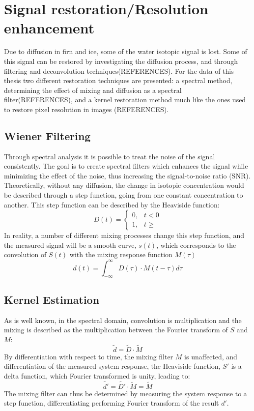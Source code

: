 \documentclass[11pt]{article}
\begin{document}
\section{Signal restoration/Resolution enhancement}
Due to diffusion in firn and ice, some of the water isotopic signal is lost. Some of this signal can be restored by investigating the diffusion process, and through filtering and deconvolution techniques(REFERENCES).
For the data of this thesis two different restoration techniques are presented: a spectral method, determining the effect of mixing and diffusion as a spectral filter(REFERENCES), and a kernel restoration method much like the ones used to restore pixel resolution in images (REFERENCES). 
\subsection{Wiener Filtering}
Through spectral analysis it is possible to treat the noise of the signal consistently. The goal is to create spectral filters which enhances the signal while minimizing the effect of the noise, thus increasing the signal-to-noise ratio (SNR).\\
Theoretically, without any diffusion, the change in isotopic concentration would be described through a step function, going from one constant concentration to another. This step function can be described by the Heaviside function:
\begin{equation}
	D(t) = \begin{cases}
		0, & t < 0 \\
		1, & t \geq
	\end{cases}
\end{equation}
In reality, a number of different mixing processes change this step function, and the measured signal will be a smooth curve, $s(t)$, which corresponds to the convolution of $S(t)$ with the mixing response function $M(\tau)$
\begin{equation}
	d(t) = \int_{- \infty}^{\infty} D(\tau) \cdot M(t - \tau)d\tau
\end{equation}
\subsection{Kernel Estimation}
As is well known, in the spectral domain, convolution is multiplication and the mixing is described as the multiplication between the Fourier transform of $S$ and $M$:
\begin{equation}
	\tilde{d} = \tilde{D} \cdot \tilde{M}
\end{equation}
By differentiation with respect to time, the mixing filter $M$ is unaffected, and differentiation of the measured system response, the Heaviside function, $S'$ is a delta function, which Fourier transformed is unity, leading to:
\begin{equation}
	\tilde{d'} = \tilde{D'} \cdot \tilde{M} = \tilde{M}
\end{equation}
The mixing filter can thus be determined by measuring the system response to a step function, differentiating performing Fourier transform of the result $d'$.
\end{document}
